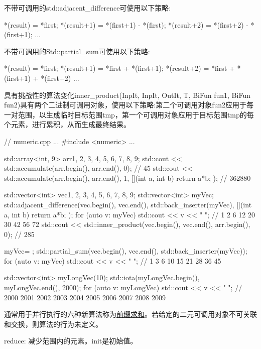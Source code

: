 不带可调用的std::adjacent\_difference可使用以下策略:

\begin{cpp}
*(result) = *first;
*(result+1) = *(first+1) - *(first);
*(result+2) = *(first+2) - *(first+1);
...
\end{cpp}

不带可调用的Std::partial\_sum可使用以下策略:

\begin{cpp}
*(result) = *first;
*(result+1) = *first + *(first+1);
*(result+2) = *first + *(first+1) + *(first+2)
...
\end{cpp}

具有挑战性的算法变化inner\_product(InpIt, InpIt, OutIt, T, BiFun fun1, BiFun fun2)具有两个二进制可调用对象，使用以下策略:第二个可调用对象fun2应用于每一对范围，以生成临时目标范围tmp，第一个可调用对象应用于目标范围tmp的每个元素，进行累积，从而生成最终结果。


\begin{cpp}
// numeric.cpp
...
#include <numeric>
...

std::array<int, 9> arr{1, 2, 3, 4, 5, 6, 7, 8, 9};
std::cout << std::accumulate(arr.begin(), arr.end(), 0); // 45
std::cout << std::accumulate(arr.begin(), arr.end(), 1,
							 [](int a, int b){ return a*b; } ); // 362880

std::vector<int> vec{1, 2, 3, 4, 5, 6, 7, 8, 9};
std::vector<int> myVec;
std::adjacent_difference(vec.begin(), vec.end(),
				std::back_inserter(myVec), [](int a, int b){ return a*b; });
for (auto v: myVec) std::cout << v << " "; // 1 2 6 12 20 30 42 56 72
std::cout << std::inner_product(vec.begin(), vec.end(), arr.begin(), 0); // 285

myVec= {};
std::partial_sum(vec.begin(), vec.end(), std::back_inserter(myVec));
for (auto v: myVec) std::cout << v << " "; // 1 3 6 10 15 21 28 36 45

std::vector<int> myLongVec(10);
std::iota(myLongVec.begin(), myLongVec.end(), 2000);
for (auto v: myLongVec) std::cout << v << " ";
						// 2000 2001 2002 2003 2004 2005 2006 2007 2008 2009
\end{cpp}


通常用于并行执行的六种新算法称为\href{https://en.wikipedia.org/wiki/Prefix_sum}{前缀求和}。若给定的二元可调用对象不可关联和交换，则算法的行为未定义。

reduce: 减少范围内的元素。init是初始值。

